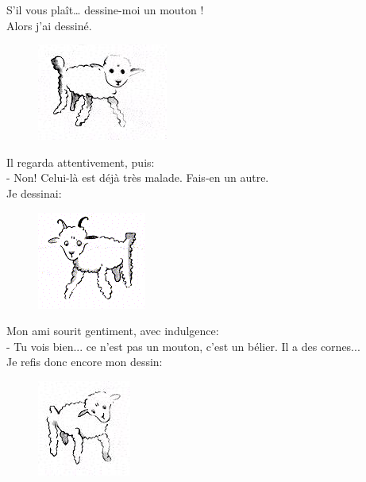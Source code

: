 \begin{multicols}{2}
  \og S'il vous plaît… dessine-moi un mouton ! \fg\\
  Alors j'ai dessiné.
  
  \begin{figure}[H]
    \centering
    \includegraphics[width=0.3\linewidth]{5x6-calcul-litteral/mouton2.png}
  \end{figure}

  Il regarda attentivement, puis: \\
  - Non! Celui-là est déjà très malade. Fais-en un autre. \\
  Je dessinai:

  \begin{figure}[H]
    \centering
    \includegraphics[width=0.3\linewidth]{5x6-calcul-litteral/mouton1.png}
  \end{figure}

  Mon ami sourit gentiment, avec indulgence: \\
  - Tu vois bien... ce n'est pas un mouton, c'est un bélier. Il a des cornes... \\
  Je refis donc encore mon dessin:

  \begin{figure}[H]
    \centering
    \includegraphics[width=0.3\linewidth]{5x6-calcul-litteral/mouton3.png}
  \end{figure}
  

\end{multicols}
